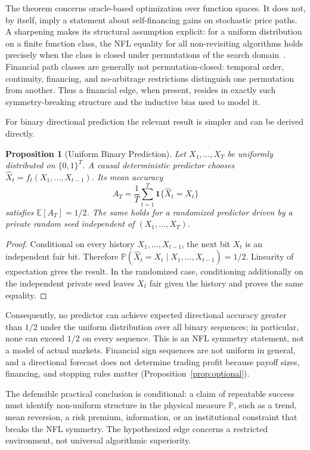 \documentclass[aps,pra,reprint,superscriptaddress,amsmath,amssymb,floatfix]{revtex4-2}
\theoremstyle{plain}
\newtheorem{proposition}[theorem]{Proposition}
\theoremstyle{definition}
\theoremstyle{remark}
\begin{document}
The theorem concerns oracle-based optimization over function spaces. It does
not, by itself, imply a statement about self-financing gains on stochastic
price paths. A sharpening makes its structural assumption explicit: for a
uniform distribution on a finite function class, the NFL equality for all
non-revisiting algorithms holds precisely when the class is closed under
permutations of the search domain~\cite{SchumacherVoseWhitley2001}. Financial
path classes are generally not permutation-closed: temporal order, continuity,
financing, and no-arbitrage restrictions distinguish one permutation from
another. Thus a financial edge, when present, resides in exactly such
symmetry-breaking structure and the inductive bias used to model it.

For binary directional prediction the relevant result is simpler and can be
derived directly.

\begin{proposition}[Uniform Binary Prediction]
  \label{prop:binary}
  Let \(X_1,\ldots,X_T\) be uniformly distributed on \(\{0,1\}^T\). A causal
  deterministic predictor chooses
  \(\widehat X_t=f_t(X_1,\ldots,X_{t-1})\). Its mean accuracy
  \[
    A_T=\frac1T\sum_{t=1}^T
      \mathbf{1}\{\widehat X_t=X_t\}
  \]
  satisfies \(\mathbb{E}[A_T]=1/2\). The same holds for a randomized predictor
  driven by a private random seed independent of
  \((X_1,\ldots,X_T)\).
\end{proposition}

\begin{proof}
Conditional on every history \(X_1,\ldots,X_{t-1}\), the next bit \(X_t\) is
an independent fair bit. Therefore
\(\mathbb{P}(\widehat X_t=X_t\mid X_1,\ldots,X_{t-1})=1/2\).
Linearity of expectation gives the result. In the randomized case, conditioning
additionally on the independent private seed leaves \(X_t\) fair given the
history and proves the same equality.
\end{proof}

Consequently, no predictor can achieve expected directional accuracy greater
than \(1/2\) under the uniform distribution over all binary sequences; in
particular, none can exceed \(1/2\) on every sequence. This is an NFL symmetry
statement, not a model of actual markets. Financial sign sequences are not
uniform in general, and a directional forecast does not determine trading
profit because payoff sizes, financing, and stopping rules matter
(Proposition~\ref{prop:optional}).

The defensible practical conclusion is conditional: a claim of repeatable
success must identify non-uniform structure in the physical measure
\(\mathbb{P}\), such as a trend, mean reversion, a risk premium, information,
or an institutional constraint that breaks the NFL symmetry. The hypothesized
edge concerns a restricted environment, not universal algorithmic
superiority.
\end{document}
